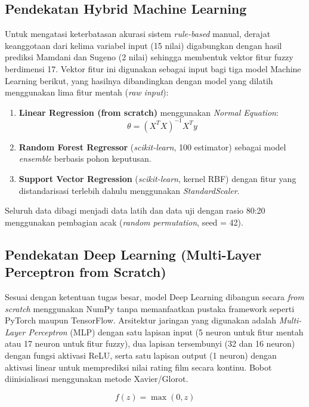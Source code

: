 \documentclass[11pt,a4paper]{article}
\begin{document}
\subsection{Pendekatan Hybrid Machine Learning}
Untuk mengatasi keterbatasan akurasi sistem \textit{rule-based} manual, derajat keanggotaan dari kelima variabel input (15 nilai) digabungkan dengan hasil prediksi Mamdani dan Sugeno (2 nilai) sehingga membentuk vektor fitur fuzzy berdimensi 17. Vektor fitur ini digunakan sebagai input bagi tiga model Machine Learning berikut, yang hasilnya dibandingkan dengan model yang dilatih menggunakan lima fitur mentah (\textit{raw input}):
\begin{enumerate}
    \item \textbf{Linear Regression (from scratch)} menggunakan \textit{Normal Equation}:
    \begin{equation}
    \theta = (X^T X)^{-1} X^T y
    \end{equation}
    \item \textbf{Random Forest Regressor} (\textit{scikit-learn}, 100 estimator) sebagai model \textit{ensemble} berbasis pohon keputusan.
    \item \textbf{Support Vector Regression} (\textit{scikit-learn}, kernel RBF) dengan fitur yang distandarisasi terlebih dahulu menggunakan \textit{StandardScaler}.
\end{enumerate}

Seluruh data dibagi menjadi data latih dan data uji dengan rasio 80:20 menggunakan pembagian acak (\textit{random permutation}, seed = 42).

\subsection{Pendekatan Deep Learning (Multi-Layer Perceptron from Scratch)}
Sesuai dengan ketentuan tugas besar, model Deep Learning dibangun secara \textit{from scratch} menggunakan NumPy tanpa memanfaatkan pustaka framework seperti PyTorch maupun TensorFlow. Arsitektur jaringan yang digunakan adalah \textit{Multi-Layer Perceptron} (MLP) dengan satu lapisan input (5 neuron untuk fitur mentah atau 17 neuron untuk fitur fuzzy), dua lapisan tersembunyi (32 dan 16 neuron) dengan fungsi aktivasi ReLU, serta satu lapisan output (1 neuron) dengan aktivasi linear untuk memprediksi nilai rating film secara kontinu. Bobot diinisialisasi menggunakan metode Xavier/Glorot.

\begin{equation}
f(z) = \max(0, z)
\end{equation}
\end{document}
